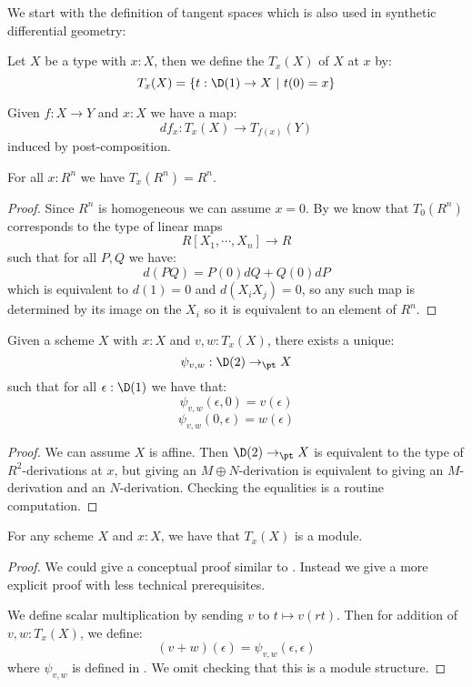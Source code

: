 We start with the definition of tangent spaces which is also used in synthetic differential geometry:

\begin{definition}
Let $X$ be a type with $x:X$, then we define the  $T_x(X)$  of $X$ at $x$ by:
\[T_x(X) = \{t:\D(1)\to X\ |\ t(0)=x\}\]
\end{definition}

\begin{definition}
Given $f:X\to Y$ and $x:X$ we have a map:
\[df_x : T_x(X)\to T_{f(x)}(Y)\]
induced by post-composition.
\end{definition}

\begin{lemma}\label{An-dimension-n}
For all $x:R^n$ we have $T_x(R^n) = R^n$.
\end{lemma}

\begin{proof}
Since $R^n$ is homogeneous we can assume $x=0$. By  we know that $T_0(R^n)$ corresponds to the type of linear maps
\[R[X_1,\cdots,X_n] \to R\]
such that for all $P,Q$ we have:
\[d(PQ) = P(0)dQ + Q(0)dP\]
which is equivalent to $d(1) = 0$ and $d(X_iX_j) = 0$, so any such map is determined by its image on the $X_i$ so it is equivalent to an element of $R^n$.
\end{proof}

\begin{lemma}\label{from-D1-to-D2}
Given a scheme $X$ with $x:X$ and $v,w:T_x(X)$, there exists a unique:
\[\psi_{v,w} : \D(2)\to_\pt X\]
such that for all $\epsilon:\D(1)$ we have that:
\[\psi_{v,w}(\epsilon,0) = v(\epsilon)\]
\[\psi_{v,w}(0,\epsilon) = w(\epsilon)\]
\end{lemma}

\begin{proof}
We can assume $X$ is affine. Then $\D(2)\to_\pt X$ is equivalent to the type of $R^2$-derivations at $x$, but giving an $M\oplus N$-derivation is equivalent to giving an $M$-derivation and an $N$-derivation. Checking the equalities is a routine computation.
\end{proof}

\begin{lemma}
For any scheme $X$ and $x:X$, we have that $T_x(X)$ is a module.
\end{lemma}

\begin{proof}
We could give a conceptual proof similar to \cite[Theorem 4.2.19]{david-orbifolds}. Instead we give a more explicit proof with less technical prerequisites.

We define scalar multiplication by sending $v$ to $t\mapsto v(rt)$. Then for addition of $v,w:T_x(X)$, we define:
\[(v+w)(\epsilon) = \psi_{v,w}(\epsilon,\epsilon)\]
where $\psi_{v,w}$ is defined in . We omit checking that this is a module structure.
\end{proof}

